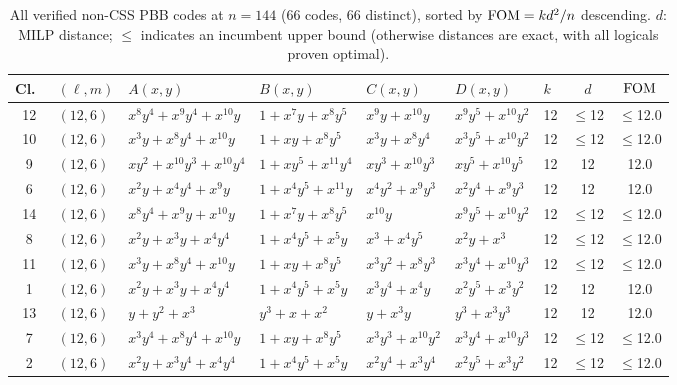 \begin{table}[t]
\centering
\caption{All verified non-CSS PBB codes at $n = 144$ (66 codes, 66 distinct), sorted by $\mathrm{FOM} = kd^2/n$ descending.
$d$: MILP distance; $\leq$ indicates an incumbent upper bound (otherwise distances are exact, with all logicals proven optimal).}
\label{tab:pbb_cat144}
\tiny
\renewcommand{\arraystretch}{0.82}
\setlength{\tabcolsep}{1.5pt}
\begin{tabular*}{\textwidth}{@{\extracolsep{\fill}}cllllllcc}
\toprule
Cl.\ & $(\ell,m)$ & $A(x,y)$ & $B(x,y)$ & $C(x,y)$ & $D(x,y)$ & $k$ & $d$ & $\mathrm{FOM}$ \\
\midrule
12 & $(12,6)$ & $x^{8}y^{4}{+}x^{9}y^{4}{+}x^{10}y$ & $1{+}x^{7}y{+}x^{8}y^{5}$ & $x^{9}y{+}x^{10}y$ & $x^{9}y^{5}{+}x^{10}y^{2}$ & 12 & $\leq$12 & $\leq$12.0 \\
10 & $(12,6)$ & $x^{3}y{+}x^{8}y^{4}{+}x^{10}y$ & $1{+}xy{+}x^{8}y^{5}$ & $x^{3}y{+}x^{8}y^{4}$ & $x^{3}y^{5}{+}x^{10}y^{2}$ & 12 & $\leq$12 & $\leq$12.0 \\
9 & $(12,6)$ & $xy^{2}{+}x^{10}y^{3}{+}x^{10}y^{4}$ & $1{+}xy^{5}{+}x^{11}y^{4}$ & $xy^{3}{+}x^{10}y^{3}$ & $xy^{5}{+}x^{10}y^{5}$ & 12 & 12 & 12.0 \\
6 & $(12,6)$ & $x^{2}y{+}x^{4}y^{4}{+}x^{9}y$ & $1{+}x^{4}y^{5}{+}x^{11}y$ & $x^{4}y^{2}{+}x^{9}y^{3}$ & $x^{2}y^{4}{+}x^{9}y^{3}$ & 12 & 12 & 12.0 \\
14 & $(12,6)$ & $x^{8}y^{4}{+}x^{9}y{+}x^{10}y$ & $1{+}x^{7}y{+}x^{8}y^{5}$ & $x^{10}y$ & $x^{9}y^{5}{+}x^{10}y^{2}$ & 12 & $\leq$12 & $\leq$12.0 \\
8 & $(12,6)$ & $x^{2}y{+}x^{3}y{+}x^{4}y^{4}$ & $1{+}x^{4}y^{5}{+}x^{5}y$ & $x^{3}{+}x^{4}y^{5}$ & $x^{2}y{+}x^{3}$ & 12 & $\leq$12 & $\leq$12.0 \\
11 & $(12,6)$ & $x^{3}y{+}x^{8}y^{4}{+}x^{10}y$ & $1{+}xy{+}x^{8}y^{5}$ & $x^{3}y^{2}{+}x^{8}y^{3}$ & $x^{3}y^{4}{+}x^{10}y^{3}$ & 12 & $\leq$12 & $\leq$12.0 \\
1 & $(12,6)$ & $x^{2}y{+}x^{3}y{+}x^{4}y^{4}$ & $1{+}x^{4}y^{5}{+}x^{5}y$ & $x^{3}y^{4}{+}x^{4}y$ & $x^{2}y^{5}{+}x^{3}y^{2}$ & 12 & 12 & 12.0 \\
13 & $(12,6)$ & $y{+}y^{2}{+}x^{3}$ & $y^{3}{+}x{+}x^{2}$ & $y{+}x^{3}y$ & $y^{3}{+}x^{3}y^{3}$ & 12 & 12 & 12.0 \\
7 & $(12,6)$ & $x^{3}y^{4}{+}x^{8}y^{4}{+}x^{10}y$ & $1{+}xy{+}x^{8}y^{5}$ & $x^{3}y^{3}{+}x^{10}y^{2}$ & $x^{3}y^{4}{+}x^{10}y^{3}$ & 12 & $\leq$12 & $\leq$12.0 \\
2 & $(12,6)$ & $x^{2}y{+}x^{3}y^{4}{+}x^{4}y^{4}$ & $1{+}x^{4}y^{5}{+}x^{5}y$ & $x^{2}y^{4}{+}x^{3}y^{4}$ & $x^{2}y^{5}{+}x^{3}y^{2}$ & 12 & $\leq$12 & $\leq$12.0 \\

\end{tabular*}
\end{table}
